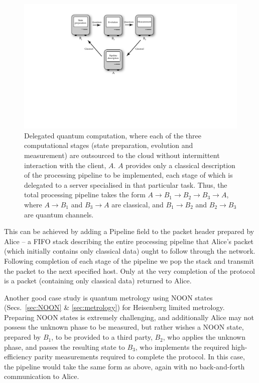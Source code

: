 \documentclass[aps,rmp,twocolumn,amsmath,amssymb,nofootinbib,superscriptaddress]{revtex4}
\begin{document}
\begin{figure}[!htb]
\includegraphics[width=\columnwidth]{delegated}
\caption{Delegated quantum computation, where each of the three computational stages (state preparation, evolution and measurement) are outsourced to the cloud without intermittent interaction with the client, $A$. $A$ provides only a classical description of the processing pipeline to be implemented, each stage of which is delegated to a server specialised in that particular task. Thus, the total processing pipeline takes the form \mbox{$A\to B_1\to B_2\to B_3\to A$}, where \mbox{$A\to B_1$} and \mbox{$B_3\to A$} are classical, and \mbox{$B_1\to B_2$} and \mbox{$B_2\to B_3$} are quantum channels.} \label{fig:delegated}
\end{figure}

This can be achieved by adding a {\sc Pipeline} field to the packet header prepared by Alice -- a FIFO stack describing the entire processing pipeline that Alice's packet (which initially contains only classical data) ought to follow through the network. Following completion of each stage of the pipeline we pop the stack and transmit the packet to the next specified host. Only at the very completion of the protocol is a packet (containing only classical data) returned to Alice.

Another good case study is quantum metrology using NOON states (Secs.~\ref{sec:NOON} \& \ref{sec:metrology}) for Heisenberg limited metrology. Preparing NOON states is extremely challenging, and additionally Alice may not possess the unknown phase to be measured, but rather wishes a NOON state, prepared by $B_1$, to be provided to a third party, $B_2$, who applies the unknown phase, and passes the resulting state to $B_3$, who implements the required high-efficiency parity measurements required to complete the protocol. In this case, the pipeline would take the same form as above, again with no back-and-forth communication to Alice.
\end{document}
